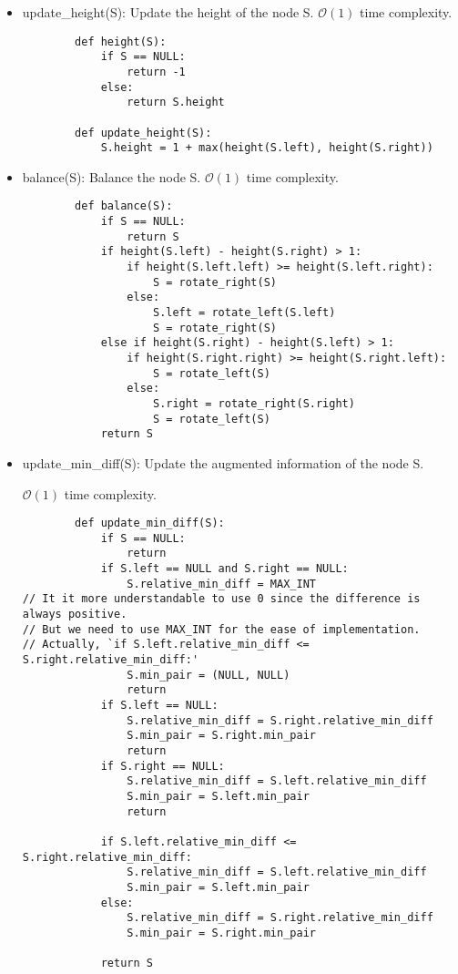 \documentclass{article}
\begin{document}
\begin{itemize}
    \item update\_height(S): Update the height of the node S.
          $ \mathcal{O}(1) $ time complexity.
          \begin{lstlisting}
        def height(S):
            if S == NULL:
                return -1
            else:
                return S.height

        def update_height(S):
            S.height = 1 + max(height(S.left), height(S.right))
    \end{lstlisting}

    \item balance(S): Balance the node S.
          $ \mathcal{O}(1) $ time complexity.
          \begin{lstlisting}
        def balance(S):
            if S == NULL:
                return S
            if height(S.left) - height(S.right) > 1:
                if height(S.left.left) >= height(S.left.right):
                    S = rotate_right(S)
                else:
                    S.left = rotate_left(S.left)
                    S = rotate_right(S)
            else if height(S.right) - height(S.left) > 1:
                if height(S.right.right) >= height(S.right.left):
                    S = rotate_left(S)
                else:
                    S.right = rotate_right(S.right)
                    S = rotate_left(S)
            return S
    \end{lstlisting}

    \item update\_min\_diff(S): Update the augmented information of the node S.

          $ \mathcal{O}(1) $ time complexity.
          \begin{lstlisting}
        def update_min_diff(S):
            if S == NULL:
                return
            if S.left == NULL and S.right == NULL:
                S.relative_min_diff = MAX_INT
// It it more understandable to use 0 since the difference is always positive.
// But we need to use MAX_INT for the ease of implementation.
// Actually, `if S.left.relative_min_diff <= S.right.relative_min_diff:'
                S.min_pair = (NULL, NULL)
                return
            if S.left == NULL:
                S.relative_min_diff = S.right.relative_min_diff
                S.min_pair = S.right.min_pair
                return
            if S.right == NULL:
                S.relative_min_diff = S.left.relative_min_diff
                S.min_pair = S.left.min_pair
                return
            
            if S.left.relative_min_diff <= S.right.relative_min_diff:
                S.relative_min_diff = S.left.relative_min_diff
                S.min_pair = S.left.min_pair
            else:
                S.relative_min_diff = S.right.relative_min_diff
                S.min_pair = S.right.min_pair
            
            return S
    \end{lstlisting}
\end{itemize}
\end{document}
